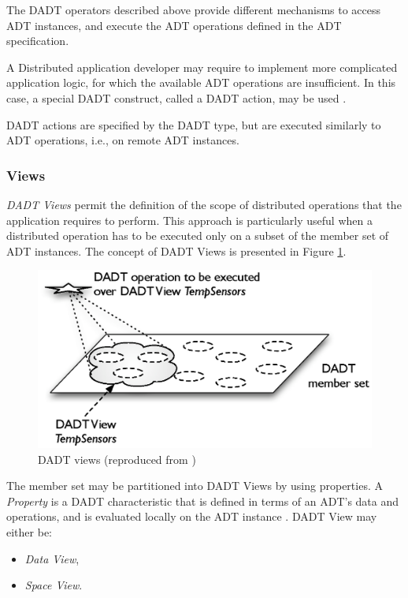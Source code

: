 The DADT operators described above provide different mechanisms to access ADT
instances, and execute the ADT operations defined in the
ADT specification.

A Distributed application developer may require to implement more complicated
application logic, for which the available ADT operations
are insufficient. In this case, a special DADT construct, called a DADT
action, may be used \cite{migliavacca_DADT:2006}. 

DADT actions are specified by the DADT type, but are executed similarly to ADT
 operations, i.e., on remote ADT instances.

\subsubsection{Views} \label{subsubsec:views}

\emph{DADT Views} permit the definition of the scope of distributed operations
that the application requires to perform. This approach is particularly useful
when a distributed operation has to be executed only on a subset of the
member set of ADT instances. The concept of DADT Views is presented in Figure
\ref{Fig:DADT_Views}.

\begin{figure}[h]
\centering
\includegraphics[scale=0.75]{img/DADT_Views.eps} 
\caption[DADT Views]{DADT views (reproduced from \cite{migliavacca_DADT:2006})}
\label{Fig:DADT_Views}
\end{figure}

The member set may be partitioned into DADT Views by using properties. A
\emph{Property} is a DADT characteristic that is defined in terms of an ADT's
data and operations, and is evaluated locally on the ADT instance
\cite{migliavacca_DADT:2006}. DADT View may either be:
\begin{itemize}
  \item \emph{Data View},
  \item \emph{Space View}.
\end{itemize}

